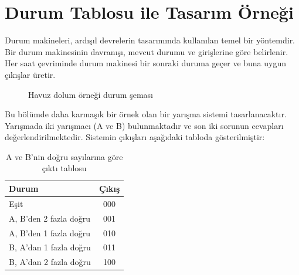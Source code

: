 \section{Durum Tablosu ile Tasarım Örneği}

Durum makineleri, ardışıl devrelerin tasarımında kullanılan temel bir yöntemdir. Bir durum makinesinin davranışı, mevcut durumu ve girişlerine göre belirlenir. Her saat çevriminde durum makinesi bir sonraki duruma geçer ve buna uygun çıkışlar üretir.

\begin{figure}[H]
\centering
{}
\caption{Havuz dolum örneği durum şeması}
\label{fig:B.28}
\end{figure}

Bu bölümde daha karmaşık bir örnek olan bir yarışma sistemi tasarlanacaktır. Yarışmada iki yarışmacı (A ve B) bulunmaktadır ve son iki sorunun cevapları değerlendirilmektedir. Sistemin çıkışları aşağıdaki tabloda gösterilmiştir:

\begin{table}[H]
\centering
\caption{A ve B'nin doğru sayılarına göre çıktı tablosu}
\label{tab:B.16}
\begin{tabular}{l|c}
\toprule
\textbf{Durum} & \textbf{Çıkış} \\
\midrule
Eşit & 000 \\
A, B'den 2 fazla doğru & 001 \\
A, B'den 1 fazla doğru & 010 \\
B, A'dan 1 fazla doğru & 011 \\
B, A'dan 2 fazla doğru & 100 \\
\bottomrule
\end{tabular}
\end{table}

